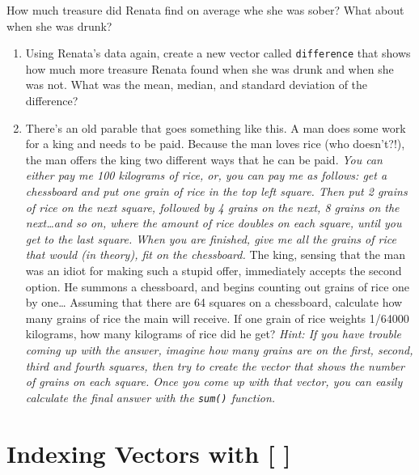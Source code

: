 \documentclass[]{book}
\theoremstyle{definition}
\theoremstyle{definition}
\theoremstyle{remark}
\begin{document}
How much treasure did Renata find on average whe she was sober? What
about when she was drunk?

\begin{enumerate}
\def\labelenumi{\arabic{enumi}.}
\setcounter{enumi}{2}
\item
  Using Renata's data again, create a new vector called
  \texttt{difference} that shows how much more treasure Renata found
  when she was drunk and when she was not. What was the mean, median,
  and standard deviation of the difference?
\item
  There's an old parable that goes something like this. A man does some
  work for a king and needs to be paid. Because the man loves rice (who
  doesn't?!), the man offers the king two different ways that he can be
  paid. \emph{You can either pay me 100 kilograms of rice, or, you can
  pay me as follows: get a chessboard and put one grain of rice in the
  top left square. Then put 2 grains of rice on the next square,
  followed by 4 grains on the next, 8 grains on the next\ldots{}and so
  on, where the amount of rice doubles on each square, until you get to
  the last square. When you are finished, give me all the grains of rice
  that would (in theory), fit on the chessboard.} The king, sensing that
  the man was an idiot for making such a stupid offer, immediately
  accepts the second option. He summons a chessboard, and begins
  counting out grains of rice one by one\ldots{} Assuming that there are
  64 squares on a chessboard, calculate how many grains of rice the main
  will receive. If one grain of rice weights 1/64000 kilograms, how many
  kilograms of rice did he get? \emph{Hint: If you have trouble coming
  up with the answer, imagine how many grains are on the first, second,
  third and fourth squares, then try to create the vector that shows the
  number of grains on each square. Once you come up with that vector,
  you can easily calculate the final answer with the \texttt{sum()}
  function.}
\end{enumerate}

\chapter{Indexing Vectors with {[} {]}}\label{vectorindexing}
\end{document}
